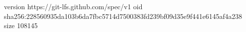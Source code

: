 version https://git-lfs.github.com/spec/v1
oid sha256:228560935da103b6da7fbc5714d7500383fd239bf09d35e9f441e6145af4a238
size 108145
